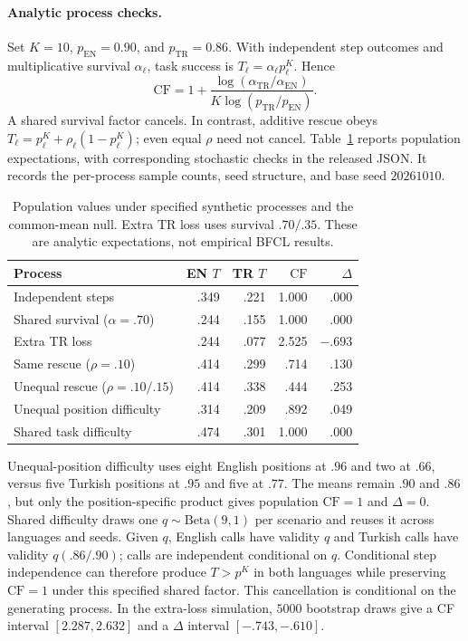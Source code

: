 \documentclass[11pt]{article}
\begin{document}
\paragraph{Analytic process checks.} Set $K=10$, $p_{\mathrm{EN}}=0.90$,
and $p_{\mathrm{TR}}=0.86$. With independent step outcomes and multiplicative
survival $\alpha_\ell$, task success is $T_\ell=\alpha_\ell p_\ell^K$. Hence
\[
\mathrm{CF}=1+
\frac{\log(\alpha_{\mathrm{TR}}/\alpha_{\mathrm{EN}})}
{K\log(p_{\mathrm{TR}}/p_{\mathrm{EN}})}.
\]
A shared survival factor cancels. In contrast, additive rescue obeys
$T_\ell=p_\ell^K+\rho_\ell(1-p_\ell^K)$; even equal $\rho$ need not cancel.
Table~\ref{tab:synthetic_cf} reports population expectations, with corresponding
stochastic checks in the released JSON. It records the per-process sample
counts, seed structure, and base seed $20261010$.

\begin{table}[ht]
\centering\footnotesize
\setlength{\tabcolsep}{2pt}
\begin{tabular}{lrrrr}
\toprule
Process & EN $T$ & TR $T$ & $\mathrm{CF}$ & $\Delta$ \\
\midrule
Independent steps & .349 & .221 & 1.000 & .000 \\
Shared survival ($\alpha=.70$) & .244 & .155 & 1.000 & .000 \\
Extra TR loss & .244 & .077 & 2.525 & $-.693$ \\
Same rescue ($\rho=.10$) & .414 & .299 & .714 & .130 \\
Unequal rescue ($\rho=.10/.15$) & .414 & .338 & .444 & .253 \\
Unequal position difficulty & .314 & .209 & .892 & .049 \\
Shared task difficulty & .474 & .301 & 1.000 & .000 \\
\bottomrule
\end{tabular}
\caption{Population values under specified synthetic processes and the
common-mean null. Extra TR loss uses survival $.70/.35$. These are analytic
expectations, not empirical BFCL results.}
\label{tab:synthetic_cf}
\end{table}

Unequal-position difficulty uses eight English positions at $.96$ and two at
$.66$, versus five Turkish positions at $.95$ and five at $.77$. The means
remain $.90$ and $.86$, but only the position-specific product gives population
$\mathrm{CF}=1$ and $\Delta=0$. Shared difficulty draws one
$q\sim\mathrm{Beta}(9,1)$ per scenario and reuses it across languages and seeds.
Given $q$, English calls have validity $q$ and Turkish calls have validity
$q(.86/.90)$; calls are independent conditional on $q$.
Conditional step independence can therefore produce $T>p^K$ in both languages
while preserving $\mathrm{CF}=1$ under this specified shared factor. This
cancellation is conditional on the generating process. In the extra-loss
simulation, $5000$ bootstrap draws give a CF interval $[2.287,2.632]$ and a
$\Delta$ interval $[-.743,-.610]$.
\end{document}
